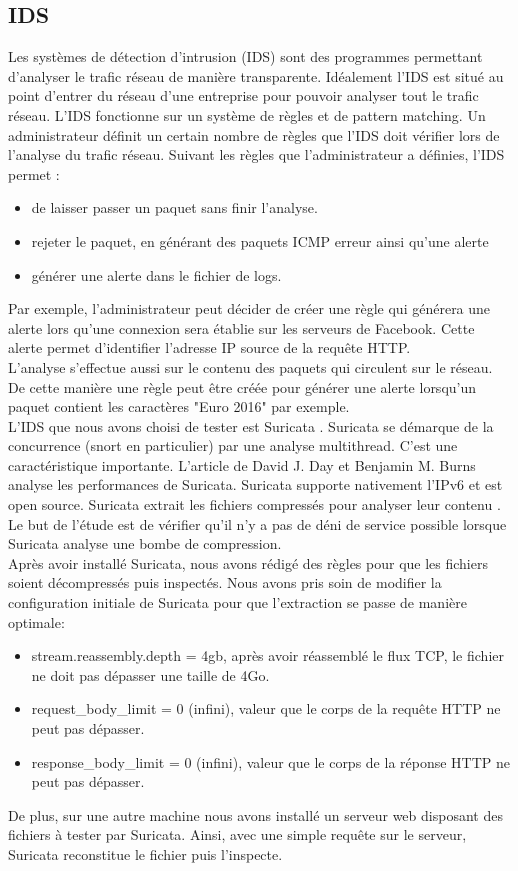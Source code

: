 \documentclass[smallextended]{svjour3}       %
\begin{document}
\subsection{IDS}
\label{2.3ids}
Les systèmes de détection d'intrusion (IDS) sont des programmes permettant d'analyser le trafic réseau de manière transparente. Idéalement l'IDS est situé au point d'entrer du réseau d'une entreprise pour pouvoir analyser tout le trafic réseau. L'IDS fonctionne sur un système de règles et de pattern matching. Un administrateur définit un certain nombre de règles que l'IDS doit vérifier lors de l'analyse du trafic réseau. Suivant les règles que l’administrateur a définies, l'IDS permet :
\begin{itemize}
\item de laisser passer un paquet sans finir l'analyse.
\item rejeter le paquet, en générant des paquets ICMP erreur ainsi qu'une alerte
\item générer une alerte dans le fichier de logs.
\end{itemize} 
Par exemple, l'administrateur peut décider de créer une règle  qui générera une alerte lors qu'une connexion sera établie sur les serveurs de Facebook. Cette alerte permet d'identifier l'adresse IP source de la requête HTTP.\\
L'analyse s'effectue aussi sur le contenu des paquets qui circulent sur le réseau. De cette manière une règle peut être créée pour générer une alerte lorsqu'un paquet contient les caractères "Euro 2016" par exemple.\\
L'IDS que nous avons choisi de tester est Suricata \cite{Suricata}. Suricata se démarque de la concurrence (snort en particulier) par une analyse multithread. C'est une caractéristique importante. L'article de David J. Day et Benjamin M. Burns \cite{PerformanceAnalysis}  analyse les performances de Suricata. Suricata supporte nativement l'IPv6 et est open source. Suricata extrait les fichiers compressés pour analyser leur contenu \cite{SuricataExtraction}. Le but de l’étude est de vérifier qu'il n'y a pas de déni de service possible lorsque Suricata analyse une bombe de compression.\\
Après avoir installé Suricata, nous avons rédigé des règles pour que les fichiers soient décompressés puis inspectés. Nous avons pris soin de modifier la configuration initiale de Suricata pour que l'extraction se passe de manière optimale:
\begin{itemize}
\item stream.reassembly.depth = 4gb, après avoir réassemblé le flux TCP, le fichier ne doit pas dépasser une taille de 4Go.
\item request\_body\_limit = 0 (infini), valeur que le corps de la requête HTTP ne peut pas dépasser.
\item response\_body\_limit = 0 (infini), valeur que le corps de la réponse HTTP ne peut pas dépasser.
\end{itemize}
De plus, sur une autre machine nous avons installé un serveur web disposant des fichiers à tester par Suricata. Ainsi, avec une simple requête sur le serveur, Suricata reconstitue le fichier puis l'inspecte.
\end{document}
